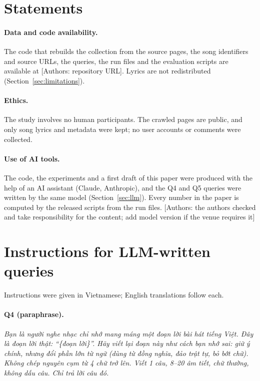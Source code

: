 \documentclass[11pt]{article}
\newcommand{\authornote}[1]{\textcolor{blue!55!black}{\textsf{\small[Authors: #1]}}}
\newcommand{\vi}[1]{\textit{#1}}          %
\newcommand{\Qfour}{Q4\xspace}
\newcommand{\Qfive}{Q5\xspace}
\begin{document}
\section*{Statements}
\paragraph{Data and code availability.} The code that rebuilds the collection from the source pages, the song
identifiers and source URLs, the queries, the run files and the evaluation scripts are available at
\authornote{repository URL}. Lyrics are not redistributed (Section~\ref{sec:limitations}).
\paragraph{Ethics.} The study involves no human participants. The crawled pages are public, and only
song lyrics and metadata were kept; no user accounts or comments were collected.
\paragraph{Use of AI tools.} The code, the experiments and a first draft of this paper were produced with
the help of an AI assistant (Claude, Anthropic), and the \Qfour{} and \Qfive{} queries were written by the same
model (Section~\ref{sec:llm}). Every number in the paper is computed by the released scripts from the run
files. \authornote{the authors checked and take responsibility for the content; add model version if the
venue requires it}




\appendix
\section{Instructions for LLM-written queries}\label{app:prompts}
Instructions were given in Vietnamese; English translations follow each.

\paragraph{\Qfour{} (paraphrase).}
\vi{Bạn là người nghe nhạc chỉ nhớ mang máng một đoạn lời bài hát tiếng Việt. Đây là đoạn lời thật:
``\{đoạn lời\}''. Hãy viết lại đoạn này như cách bạn nhớ sai: giữ ý chính, nhưng đổi phần lớn từ ngữ (dùng
từ đồng nghĩa, đảo trật tự, bỏ bớt chữ). Không chép nguyên cụm từ 4 chữ trở lên. Viết 1 câu, 8--20 âm
tiết, chữ thường, không dấu câu. Chỉ trả lời câu đó.}
\end{document}
